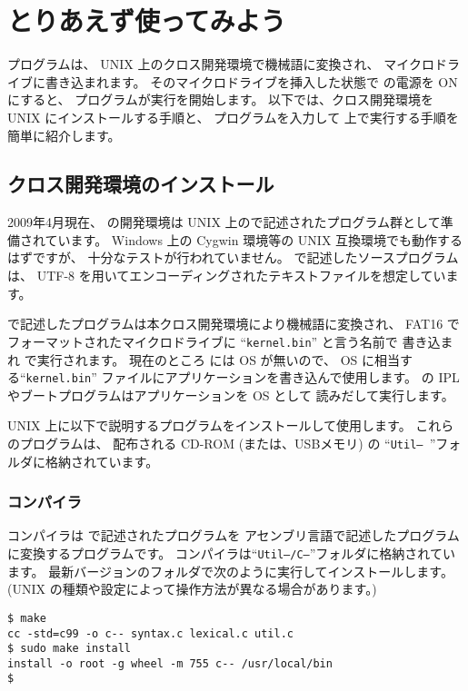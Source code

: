 % 
%
\chapter{とりあえず使ってみよう}

\cmm プログラムは、 UNIX 上のクロス開発環境で機械語に変換され、
マイクロドライブに書き込まれます。
そのマイクロドライブを挿入した状態で \tac の電源を ON にすると、
\cmm プログラムが実行を開始します。
以下では、クロス開発環境を UNIX にインストールする手順と、
\cmm プログラムを入力して \tac 上で実行する手順を簡単に紹介します。

\section{クロス開発環境のインストール}

2009年4月現在、
\cmml の開発環境は UNIX 上の\cl で記述されたプログラム群として準備されています。
Windows 上の Cygwin 環境等の UNIX 互換環境でも動作するはずですが、
十分なテストが行われていません。
\cmml で記述したソースプログラムは、
UTF-8 を用いてエンコーディングされたテキストファイルを想定しています。

\cmml で記述したプログラムは本クロス開発環境により機械語に変換され、
FAT16 でフォーマットされたマイクロドライブに ``{\tt kernel.bin}'' と言う名前で
書き込まれ \tac で実行されます。
現在のところ \tac には OS が無いので、
OS に相当する``{\tt kernel.bin}''
ファイルにアプリケーションを書き込んで使用します。
\tac の IPL やブートプログラムはアプリケーションを OS として
読みだして実行します。

UNIX 上に以下で説明するプログラムをインストールして使用します。
これらのプログラムは、
配布される CD-ROM (または、USBメモリ) の
``{\tt Util-- }''フォルダに格納されています。

\subsection{\cmm コンパイラ}

\cmm コンパイラは \cmml で記述されたプログラムを
\tac アセンブリ言語で記述したプログラムに変換するプログラムです。
\cmm コンパイラは``{\tt Util--/C--}''フォルダに格納されています。
最新バージョンのフォルダで次のように実行してインストールします。
(UNIX の種類や設定によって操作方法が異なる場合があります。)

\begin{mylist}
\begin{verbatim}
$ make
cc -std=c99 -o c-- syntax.c lexical.c util.c
$ sudo make install
install -o root -g wheel -m 755 c-- /usr/local/bin
$
\end{verbatim}
\end{mylist}

